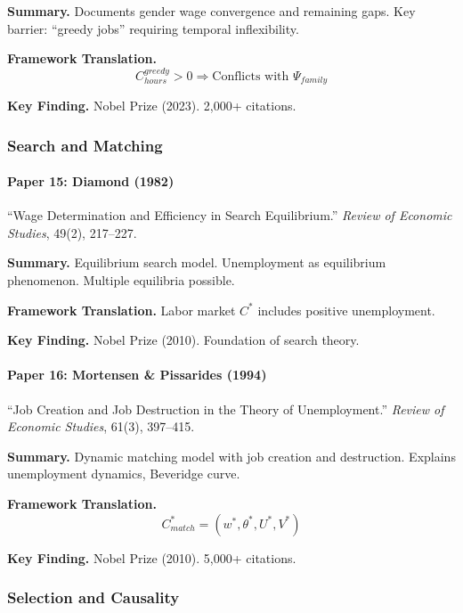 \textbf{Summary.}
Documents gender wage convergence and remaining gaps. Key barrier: 
``greedy jobs'' requiring temporal inflexibility.

\textbf{Framework Translation.}
\begin{equation}
C_{hours}^{greedy} > 0 \Rightarrow \text{Conflicts with } \Psi_{family}
\end{equation}

\textbf{Key Finding.}
Nobel Prize (2023). 2,000+ citations.

\subsubsection{Search and Matching}

\paragraph{Paper 15: Diamond (1982)}

``Wage Determination and Efficiency in Search Equilibrium.''
\textit{Review of Economic Studies}, 49(2), 217--227.

\textbf{Summary.}
Equilibrium search model. Unemployment as equilibrium phenomenon. 
Multiple equilibria possible.

\textbf{Framework Translation.}
Labor market $C^*$ includes positive unemployment.

\textbf{Key Finding.}
Nobel Prize (2010). Foundation of search theory.

\paragraph{Paper 16: Mortensen \& Pissarides (1994)}

``Job Creation and Job Destruction in the Theory of Unemployment.''
\textit{Review of Economic Studies}, 61(3), 397--415.

\textbf{Summary.}
Dynamic matching model with job creation and destruction. Explains 
unemployment dynamics, Beveridge curve.

\textbf{Framework Translation.}
\begin{equation}
C^*_{match} = (w^*, \theta^*, U^*, V^*)
\end{equation}

\textbf{Key Finding.}
Nobel Prize (2010). 5,000+ citations.

\subsubsection{Selection and Causality}


